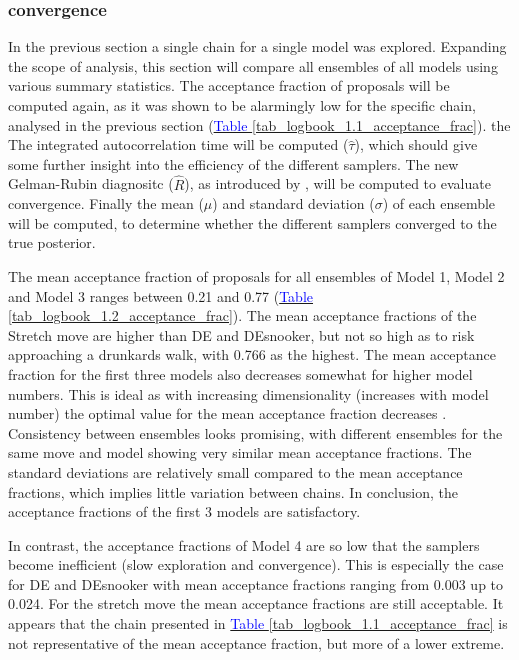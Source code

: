 \subsubsection{convergence}
In the previous section a single chain for a single model was explored. Expanding the scope of analysis, this section will compare all ensembles of all models using various summary statistics. The acceptance fraction of proposals will be computed again, as it was shown to be alarmingly low for the specific chain, analysed in the previous section  (\hyperref[tab_logbook_1.1_acceptance_frac]{\textcolor{blue}{Table }\ref{tab_logbook_1.1_acceptance_frac}}). the The integrated autocorrelation time will be computed ($\hat{\tau}$), which should give some further insight into the efficiency of the different samplers. The new Gelman-Rubin diagnositc ($\hat{R}$), as introduced by \citet{vehtari2021rank}, will be computed to evaluate convergence. Finally the mean ($\mu$) and standard deviation ($\sigma$) of each ensemble will be computed, to determine whether the different samplers converged to the true posterior.   

The mean acceptance fraction of proposals for all ensembles of Model 1, Model 2 and Model 3 ranges between 0.21 and 0.77 (\hyperref[tab_logbook_1.2_acceptance_frac]{\textcolor{blue}{Table }\ref{tab_logbook_1.2_acceptance_frac}}). The mean acceptance fractions of the Stretch move are higher than DE and DEsnooker, but not so high as to risk approaching a drunkards walk, with 0.766 as the highest. The mean acceptance fraction for the first three models also decreases somewhat for higher model numbers. This is ideal as with increasing dimensionality (increases with model number) the optimal value for the mean acceptance fraction decreases \citet{gelman2021bayesian}. Consistency between ensembles looks promising, with different ensembles for the same move and model showing very similar mean acceptance fractions. The standard deviations are relatively small compared to the mean acceptance fractions, which implies little variation between chains. In conclusion, the acceptance fractions of the first 3 models are satisfactory. 

In contrast, the acceptance fractions of Model 4 are so low that the samplers become inefficient (slow exploration and convergence). This is especially the case for DE and DEsnooker with mean acceptance fractions ranging from 0.003 up to 0.024. For the stretch move the mean acceptance fractions are still acceptable. It appears that the chain presented in \hyperref[tab_logbook_1.1_acceptance_frac]{\textcolor{blue}{Table }\ref{tab_logbook_1.1_acceptance_frac}} is not representative of the mean acceptance fraction, but more of a lower extreme. 

